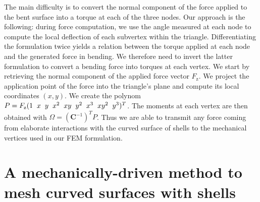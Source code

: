 \documentclass{llncs}
\begin{document}
The main difficulty is to convert the normal component of the force applied to the bent surface into a torque at each of the three nodes. Our approach is the following: during force computation, we use the angle measured at each node to compute the local deflection of each subvertex within the triangle. Differentiating the formulation twice yields a relation between the torque applied at each node and the generated force in bending. We therefore need to invert the latter formulation to convert a bending force into torques at each vertex. We start by retrieving the normal component of the applied force vector $F_{\mathrm{z}}$. We project the application point of the force into the triangle's plane and compute its local coordinates $(x,y)$. We create the polynom $P = F_{\mathrm{z}}(1 \hspace{0.2cm} x \hspace{0.2cm} y \hspace{0.2cm} x^2 \hspace{0.2cm} xy \hspace{0.2cm} y^2 \hspace{0.2cm} x^3 \hspace{0.2cm} xy^2 \hspace{0.2cm} y^3)^T$. The moments at each vertex are then obtained with $\Omega = (\textbf{C}^{-1})^T P$.  Thus we are able to transmit any force coming from elaborate interactions with the curved surface of shells to the mechanical vertices used in our FEM formulation. 

\section{A mechanically-driven method to mesh curved surfaces with shells}
\label{sec:mesh}
\end{document}
